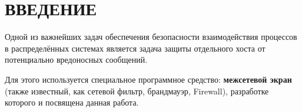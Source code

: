 \section*{ВВЕДЕНИЕ}

Одной из важнейших задач обеспечения безопасности взаимодействия процессов в распределённых системах является задача защиты отдельного хоста от потенциально вредоносных сообщений. 

Для этого используется специальное программное средство: \textbf{межсетевой экран} (также известный, как сетевой фильтр, брандмауэр, Firewall), разработке которого и посвящена данная работа.
